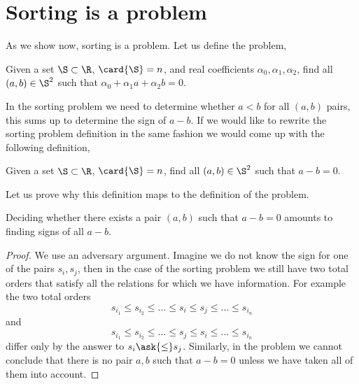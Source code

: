 \section{Sorting is a \twoLDT problem}

As we show now, sorting is a \twoLDT problem. Let us define the
\twoLDT problem,

\begin{problem}
Given a set $\S \subset \R$, $\card{\S} = n$, and real coefficients $\alpha_0,
\alpha_1, \alpha_2$, find all $(a,b) \in \S^2$ such that
$\alpha_0 + \alpha_1 a + \alpha_2 b = 0$.
\end{problem}

In the sorting problem we need to determine whether $a < b$ for all $(a,b)$
pairs, this sums up to determine the sign of $a-b$. If we would like to rewrite
the sorting problem definition in the same fashion we would come up with the
following definition,

\begin{problem}
Given a set $\S \subset \R$, $\card{\S} = n$, find all $(a,b) \in \S^2$ such that
$a - b = 0$.
\end{problem}

Let us prove why this definition maps to the definition of the \twoLDT
problem.

\begin{theorem}
Deciding whether there exists a pair \((a,b)\) such that \(a - b = 0\)
amounts to finding signs of all \(a-b\).
\end{theorem}

\begin{proof}
We use an adversary argument. Imagine we do not know the sign for one of the
pairs \(s_i,s_j\), then in the case of the sorting problem we still have two
total orders that satisfy all the relations for which we have information. For
example the two total orders
\begin{displaymath}
s_{i_1} \le s_{i_2} \le \ldots \le s_i \le s_j \le \ldots \le s_{i_n}
\end{displaymath}
and
\begin{displaymath}
s_{i_1} \le s_{i_2} \le \ldots \le s_j \le s_i \le \ldots \le s_{i_n}
\end{displaymath}
differ only by the answer to \(s_i \ask{\le} s_j\).
Similarly, in the \twoLDT problem we cannot conclude that there is no pair
\(a,b\) such that \(a-b=0\) unless we have taken all of them into account.
\end{proof}

